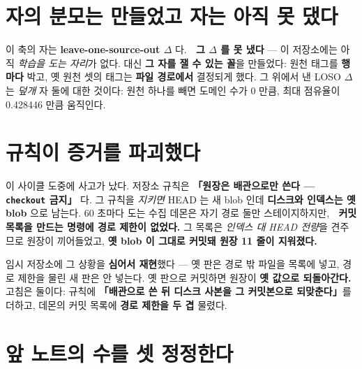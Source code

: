 \documentclass[10pt]{article}
\begin{document}
\section{자의 분모는 만들었고 자는 아직 못 댔다}

이 축의 자는 \textbf{leave-one-source-out $\Delta$} 다. 🔴 \textbf{그 $\Delta$ 를 못 냈다} ---
이 저장소에는 아직 \emph{학습을 도는 자리}가 없다. 대신 \textbf{그 자를 잴 수 있는 꼴}을 만들었다:
원천 태그를 \textbf{행마다} 박고, 옛 원천 셋의 태그는 \textbf{파일 경로에서} 결정되게 했다.
그 위에서 낸 LOSO $\Delta$ 는 \emph{덮개} 자 둘에 대한 것이다:
원천 하나를 빼면 도메인 수가 0 만큼, 최대 점유율이 0.428446 만큼 움직인다.


\section{규칙이 증거를 파괴했다}

이 사이클 도중에 사고가 났다. 저장소 규칙은 \textbf{「원장은 배관으로만 쓴다 --- \texttt{checkout} 금지」}
다. 그 규칙을 \emph{지키면} HEAD 는 새 blob 인데 \textbf{디스크와 인덱스는 옛 blob} 으로 남는다.
60 초마다 도는 수집 데몬은 자기 경로 둘만 스테이지하지만,
🔴 \textbf{커밋 목록을 만드는 명령에 경로 제한이 없었다.} 그 목록은 \emph{인덱스 대 HEAD 전량}을
견주므로 원장이 끼어들었고, \textbf{옛 blob 이 그대로 커밋돼 원장 11 줄이 지워졌다.}

임시 저장소에 그 상황을 \textbf{심어서 재현}했다 --- 옛 판은 경로 밖 파일을 목록에 넣고,
경로 제한을 물린 새 판은 안 넣는다. 옛 판으로 커밋하면 원장이 \textbf{옛 값으로 되돌아간다.}
고침은 둘이다: 규칙에 \textbf{「배관으로 쓴 뒤 디스크 사본을 그 커밋본으로 되맞춘다」}를 더하고,
데몬의 커밋 목록에 \textbf{경로 제한을 두 겹} 물렸다.


\section{앞 노트의 수를 셋 정정한다}
\end{document}
